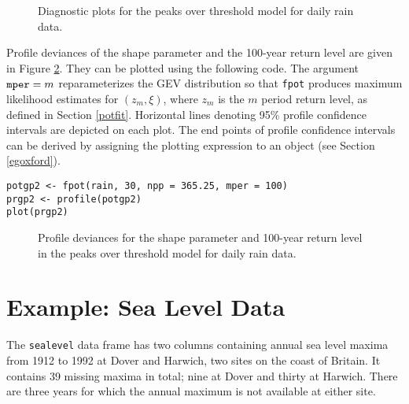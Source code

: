 \documentclass[11pt,a4paper]{article}
\begin{document}
\begin{figure}
\begin{center}
\vspace{-1.5cm}
\hspace{0cm}
\hspace{0cm} 
\hspace{0cm}
\end{center} 
\caption{Diagnostic plots for the peaks over threshold model for daily rain data.}
\label{potdiag}
\end{figure}

Profile deviances of the shape parameter and the 100-year return level are given in Figure \ref{potprof}. They can be plotted using the following code. The argument $\verb+mper+ = m$ reparameterizes the GEV distribution so that \verb+fpot+ produces maximum likelihood estimates for $(z_m,\xi)$, where $z_m$ is the $m$ period return level, as defined in Section \ref{potfit}. 
 Horizontal lines denoting 95\% profile confidence intervals are depicted on each plot. The end points of profile confidence intervals can be derived by assigning the plotting expression to an object (see Section \ref{egoxford}).
 
\begin{verbatim}
potgp2 <- fpot(rain, 30, npp = 365.25, mper = 100)
prgp2 <- profile(potgp2)
plot(prgp2)
\end{verbatim}

\begin{figure}
\begin{center}
\vspace{-1.5cm}
\hspace{0cm}
\end{center} 
\caption{Profile deviances for the shape parameter and 100-year return level in the peaks over threshold model for daily rain data.}
\label{potprof}
\end{figure}


\section{Example: Sea Level Data}
\setcounter{footnote}{0}
\label{egsealevel}

The \verb+sealevel+ data frame \citep{coletawn90} has two columns containing annual sea level maxima from 1912 to 1992 at Dover and Harwich, two sites on the coast of Britain. 
It contains 39 missing maxima in total; nine at Dover and thirty at Harwich.
There are three years for which the annual maximum is not available at either site.
\end{document}

